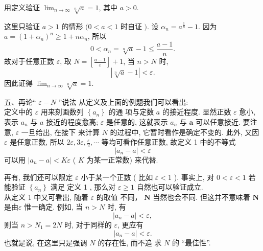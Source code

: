\documentclass [t,12pt,mathserif] {beamer}
\begin{document}
\begin{frame}{}%
\begin{ex}
 用定义验证 $\lim _{n \rightarrow \infty} \sqrt[n]{a}=1$, 其中 $a>0$. 
\end{ex}
\zheng 这里只验证 $a>1$ 的情形 $(0<a<1$ 时自证 $)$. 设 $\alpha_n=a^{\frac{1}{n}}-1$. 因为 $a=\left(1+\alpha_n\right)^n \geq 1+n \alpha_n$, 所以
$$
0<\alpha_n=\sqrt[n]{a}-1 \leq \frac{a-1}{n} .
$$
故对于任意正数 $\varepsilon$, 取 $N=\left[\frac{a-1}{\varepsilon}\right]+1$, 当 $n>N$ 时,
$$
|\sqrt[n]{a}-1|<\varepsilon.
$$
因此证得 $\lim _{n \rightarrow \infty} \sqrt[n]{a}=1$.  
\end{frame}



\begin{frame}{  五、再论`` $\varepsilon-N$ ”说法}%
 从定义及上面的例题我们可以看出:\\
 定义中的 $\varepsilon$ 用来刻画数列 $\left\{a_n\right\}$ 的通 项与定数 $a$ 的接近程度. 显然正数 $\varepsilon$ 愈小,表示 $a_n$ 与 $a$ 接近的程度愈高; $\varepsilon$ 是任意的, 这就表示 $a_n$ 与 $\boldsymbol{a}$ 可以任意接近. 要注意, $\varepsilon$ 一旦给出, 在接下 来计算 $N$ 的过程中, 它暂时看作是确定不变的. 此外, 又因 $\varepsilon$ 是任意正数, 所以 $2 \varepsilon, 3 \varepsilon, \frac{\varepsilon}{2}, \cdots$ 等均可看作任意正数, 故定义 1 中的不等式
$$
\left|a_n-a\right|<\varepsilon
$$
可以用 $\left|a_n-a\right|<K \varepsilon$ ( $K$ 为某一正常数) 来代替. 
 
\end{frame}


\begin{frame}{}%
再有, 我们还可以限定 $\varepsilon$ 小于某一个正数 ( 比如 $\varepsilon<1$ ). 事实上, 对 $0<\varepsilon<1$ 若能验证 $\left\{a_n\right\}$ 满足 定义 1 , 那么对 $\varepsilon \geq 1$ 自然也可以验证成立.\\
 从定义 1 中又可看出, 随着 $\varepsilon$ 的取值 不同， $\boldsymbol{N}$ 当然也会不同. 但这并不意味着 $\boldsymbol{N}$ 是由$\varepsilon$ 惟一确定. 例如, 当 $n>N$ 时, 有
$$
\left|a_n-a\right|<\varepsilon,
$$
则当 $n>N_1=2 N$ 时, 对于同样的 $\varepsilon$, 更应有
$$
\left|a_n-a\right|<\varepsilon .
$$
也就是说, 在这里只是强调 $N$ 的存在性, 而不追 求 $N$ 的 “最佳性”.     
\end{frame}
\end{document}
